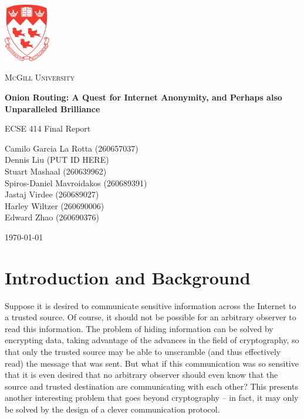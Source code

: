 \documentclass[10pt]{report}
\begin{document}
\begin{titlepage}
    \begin{center}
        \includegraphics[width=0.15\textwidth]{McGill.pdf}~\par\vspace{1cm}
        {\scshape\LARGE McGill University \par}
        \vspace{1cm}
        {\huge\bfseries Onion Routing: A Quest for Internet Anonymity, and Perhaps also Unparalleled Brilliance\par}
        \vspace{1.5cm}
        {\Large ECSE 414 Final Report\par}
        \vspace{2cm}
        {\Large Camilo Garcia La Rotta (260657037)\\}
        {\Large Dennis Liu (PUT ID HERE)\\}
        {\Large Stuart Mashaal (260639962)\\}
        {\Large Spiros-Daniel Mavroidakos (260689391)\\}
        {\Large Jastaj Virdee (260689027)\\}
        {\Large Harley Wiltzer (260690006)\\}
        {\Large Edward Zhao (260690376)\\}
        \vfill
        {\large \today\par}
    \end{center}
\end{titlepage}

\tableofcontents

\doublespacing


\chapter{Introduction and Background}
Suppose it is desired to communicate sensitive information across the Internet to a trusted source.
Of course, it should not be possible for an arbitrary observer to read this information. The problem
of hiding information can be solved by encrypting data, taking advantage of the advances in the
field of cryptography, so that only the trusted source may be able to unscramble (and thus
effectively read) the message that was sent. But what if this communication was so sensitive that it
is even desired that no arbitrary observer should even know that the source and trusted destination
are communicating with each other? This presents another interesting problem that goes beyond
cryptography -- in fact, it may only be solved by the design of a clever communication protocol.\\
\end{document}
